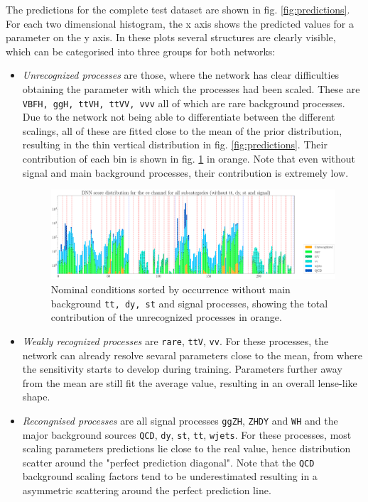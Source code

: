 \Subsection{\textcolor{red}{Network Predictions}}

The predictions for the complete test dataset are shown in fig. \ref{fig:predictions}. For each two dimensional histogram, the x axis shows the predicted values for a parameter on the y axis. In these plots several structures are clearly visible, which can be categorised into three groups for both networks:

\begin{itemize}
	\item[] \textit{Unrecognized processes} are those, where the network has clear difficulties obtaining the parameter with which the processes had been scaled. These are \texttt{VBFH, ggH, ttVH, ttVV, vvv} all of which are rare background processes. Due to the network not being able to differentiate between the different scalings, all of these are fitted close to the mean of the prior distribution, resulting in the thin vertical distribution in fig. \ref{fig:predictions}. Their contribution of each bin is shown in fig. \ref{fig:cond_without_sig_bkg} in orange. Note that even without signal and main background processes, their contribution is extremely low.
	
	\begin{figure}[h!]
		\centering
		\includegraphics[width=\linewidth]{figures/inference/cond4_sorted_no_main_bkg_no_sig.pdf}
		\caption{Nominal conditions sorted by occurrence without main background \texttt{tt, dy, st} and signal processes, showing the total contribution of the unrecognized processes in orange.}
		\label{fig:cond_without_sig_bkg}
	\end{figure}
	
	\item[] \textit{Weakly recognized processes} are \texttt{rare}, \texttt{ttV}, \texttt{vv}. For these processes, the network can already resolve sevaral parameters close to the mean, from where the sensitivity starts to develop during training. Parameters further away from the mean are still fit the average value, resulting in an overall lense-like shape.
	\item[] \textit{Recongnised processes} are all signal processes \texttt{ggZH}, \texttt{ZHDY} and \texttt{WH} and the major background sources \texttt{QCD}, \texttt{dy}, \texttt{st}, \texttt{tt}, \texttt{wjets}. For these processes, most scaling parameters predictions lie close to the real value, hence distribution scatter around the "perfect prediction diagonal". Note that the \texttt{QCD} background scaling factors tend to be underestimated resulting in a asymmetric scattering around the perfect prediction line.
\end{itemize}

